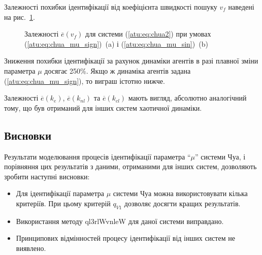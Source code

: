 Залежності похибки ідентифікації від коефіцієнта швидкості пошуку
$v_f$ наведені на рис.~\ref{atu:f:chua_e_v_f}.

\begin{figure}[htb!]
  \caption{Залежності $ \overline{e} (v_f) $ для системи (\ref{atu:eq:chua2}) при умовах (\ref{atu:eq:chua_mu_sign})~(a) і (\ref{atu:eq:chua_mu_sin})~(b)}
  \label{atu:f:chua_e_v_f}
\end{figure}

Зниження похибки ідентифікації за рахунок динаміки агентів в
разі плавної зміни параметра
$ \mu $ досягає 250\%. Якщо ж динаміка агентів задана (\ref{atu:eq:chua_mu_sign}),
то виграш істотно нижче.

Залежності
$\overline{e}(k_e)$,
$\overline{e}(k_{nl})$ та
$\overline{e}(k_{cl})$
мають вигляд, абсолютно аналогічний тому, що був отриманий для
інших систем хаотичної динаміки.





\subsection{Висновки} %

Результати моделювання процесів ідентифікації параметра ``$\mu$''
системи Чуа, і порівняння цих результатів з даними, отриманими
для інших систем, дозволяють зробити наступні висновки:

\begin{itemize}

  \item
    Для ідентифікації параметра
    $ \mu $ системи Чуа можна використовувати кілька критеріїв. При
    цьому критерій
    $ q_{V1} $ дозволяє досягти кращих результатів.

  \item
    Використання методу ql3rlWvnleW для даної системи виправдано.

  \item
    Принципових відмінностей процесу ідентифікації від інших
    систем не виявлено.

\end{itemize}






